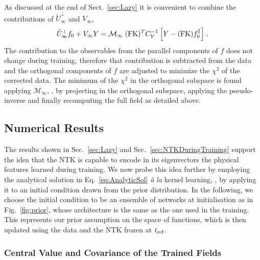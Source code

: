As discussed at the end of Sect.~\ref{sec:Lazy} it is convenient to combine the
contributions of $\check{U}^\perp_{\infty}$ and $V_{\infty}$,
\begin{align}
    \label{eq:DataCorrectedInferenceAtInfty}
    \check{U}^{\perp}_{\infty} f_{0} + V_{\infty} Y 
        = \mathcal{M}_{\infty}\; (\mathrm{FK})^T C_Y^{-1} \left[Y - (\mathrm{FK}) f_{0}^{\parallel}\right]\, .
\end{align}
The contribution to the observables from the parallel components of $f$ does not
change during training, therefore that contribution is subtracted from the data
and the orthogonal components of $f$ are adjusted to minimize the $\chi^2$ of
the corrected data. The minimum of the $\chi^2$ in the orthogonal subspace is
found applying $\mathcal{M}_{\infty}$, \ie, by projecting in the orthogonal
subspace, applying the pseudo-inverse and finally recomputing the full field as
detailed above.


\FloatBarrier

\subsection{Numerical Results}
\label{sec:NTKKernelLearning}

The results shown in Sec.~\ref{sec:Lazy} and Sec.~\ref{sec:NTKDuringTraining}
support the idea that the NTK is capable to encode in its eigenvectors the
physical features learned during training. We now probe this idea further by
employing the analytical solution in Eq.~\eqref{eq:AnalyticSol} \textit{\`a la}
kernel learning, \ie, by applying it to an initial condition drawn from the prior distribution. 
In the following, we choose the initial condition to be an ensemble of
networks at initialisation as in Fig.~\ref{fig:prior}, whose architecture is the
same as the one used in the training. This represents our prior assumption on
the space of functions, which is then updated using the data and the NTK frozen
at $t_{\rm ref}$.

\subsubsection{Central Value and Covariance of the Trained Fields}
\label{sec:CentralAndCovariance}

